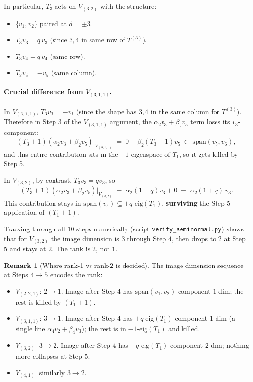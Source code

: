 \documentclass[11pt]{article}
\theoremstyle{definition}
\newtheorem{remark}[theorem]{Remark}
\begin{document}
In particular, $T_3$ acts on $V_{(3,2)}$ with the structure:
\begin{itemize}[topsep=0.3em,itemsep=0.2em,leftmargin=2em]
\item $\{v_1, v_2\}$ paired at $d=\pm 3$.
\item $T_3 v_3 = q\, v_3$ (since $3, 4$ in same row of $T^{(3)}$).
\item $T_3 v_4 = q\, v_4$ (same row).
\item $T_3 v_5 = -v_5$ (same column).
\end{itemize}

\paragraph{Crucial difference from $V_{(3,1,1)}$.}
In $V_{(3,1,1)}$, $T_3 v_3 = -v_3$ (since the
shape has $3, 4$ in the same column for $T^{(3)}$). Therefore
in Step 3 of the $V_{(3,1,1)}$ argument, the
$\alpha_2 v_3 + \beta_2 v_5$ term loses its $v_3$-component:
\[
(T_3{+}1)(\alpha_2 v_3 + \beta_2 v_5)\big|_{V_{(3,1,1)}}
\;=\; 0 + \beta_2 (T_3{+}1) v_5
\;\in\; \mathrm{span}(v_5, v_6),
\]
and this entire contribution sits in the $-1$-eigenspace of $T_1$,
so it gets killed by Step 5.

In $V_{(3,2)}$, by contrast, $T_3 v_3 = q v_3$, so
\[
(T_3{+}1)(\alpha_2 v_3 + \beta_2 v_5)\big|_{V_{(3,2)}}
\;=\; \alpha_2 (1{+}q) v_3 + 0
\;=\; \alpha_2(1{+}q)\, v_3.
\]
This contribution stays in $\mathrm{span}(v_3) \subseteq +q\text{-eig}(T_1)$,
\textbf{surviving} the Step 5 application of $(T_1{+}1)$.

Tracking through all $10$ steps numerically (script
\texttt{verify\_seminormal.py}) shows that for $V_{(3,2)}$
the image dimension is $3$ through Step $4$, then drops to $2$ at Step $5$
and stays at $2$. The rank is $2$, not $1$.

\begin{remark}[Where rank-1 vs rank-2 is decided]
The image dimension sequence at Steps $4 \to 5$ encodes the rank:
\begin{itemize}[topsep=0.3em,itemsep=0.2em,leftmargin=2em]
\item $V_{(2,2,1)}$: $2 \to 1$. Image after Step 4 has $\mathrm{span}(v_1, v_2)$
component $1$-dim; the rest is killed by $(T_1{+}1)$.
\item $V_{(3,1,1)}$: $3 \to 1$. Image after Step 4 has $+q$-eig$(T_1)$
component $1$-dim (a single line $\alpha_4 v_2 + \beta_4 v_3$); the rest
is in $-1$-eig$(T_1)$ and killed.
\item $V_{(3,2)}$: $3 \to 2$. Image after Step 4 has $+q$-eig$(T_1)$
component $2$-dim; nothing more collapses at Step 5.
\item $V_{(4,1)}$: similarly $3 \to 2$.
\end{itemize}
\end{remark}
\end{document}
